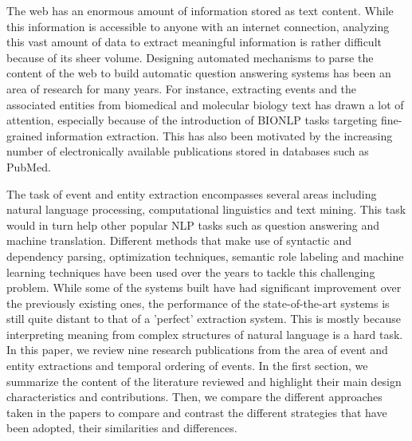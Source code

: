 The web has an enormous amount of information stored as text content. While this information is accessible to anyone with an internet connection, analyzing this vast amount of data to extract meaningful information is rather difficult because of its sheer volume. Designing automated mechanisms to parse the content of the web to build automatic question answering systems has been an area of research for many years. For instance, extracting events and the associated entities from biomedical and molecular biology text has drawn a lot of attention, especially because of the introduction of BIONLP tasks targeting fine-grained information extraction. This has also been motivated by the increasing number of electronically available publications stored in databases such as PubMed. 

The task of event and entity extraction encompasses several areas including natural language processing, computational linguistics and text mining. This task would in turn help other popular NLP tasks such as question answering and machine translation. Different methods that make use of syntactic and dependency parsing, optimization techniques, semantic role labeling and machine learning techniques have been used over the years to tackle this challenging problem. While some of the systems built have had significant improvement over the previously existing ones, the performance of the state-of-the-art systems is still quite distant to that of a 'perfect' extraction system. This is mostly because interpreting meaning from complex structures of natural language is a hard task. In this paper, we review nine research publications from the area of event and entity extractions and temporal ordering of events. In the first section, we summarize the content of the literature reviewed and highlight their main design characteristics and contributions. Then, we compare the different approaches taken in the papers to compare and contrast the different strategies that have been adopted, their similarities and differences.